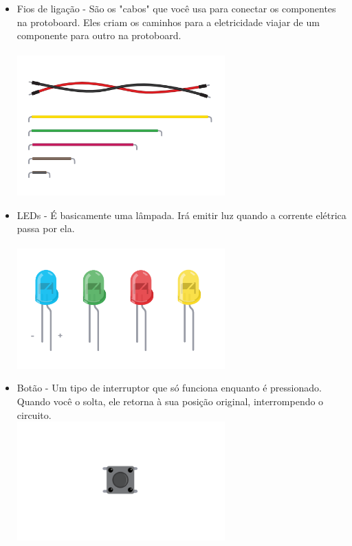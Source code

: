 \documentclass{report}
\begin{document}
\begin{itemize}
		\item Fios de ligação - São os "cabos" que você usa para conectar os componentes na protoboard. Eles criam os caminhos para a eletricidade viajar de um componente para outro na protoboard. \\ \\
		\includegraphics[width=8cm]{imagens/fios_ligacao.png}
		
		\item LEDs - É basicamente uma lâmpada. Irá emitir luz quando a corrente elétrica passa por ela. \\ \\
		\includegraphics[width=8cm]{imagens/leds.png}
		
		\item Botão - Um tipo de interruptor que só funciona enquanto é pressionado. Quando você o solta, ele retorna à sua posição original, interrompendo o circuito. \\
		\includegraphics[width=8cm]{imagens/botao.png}
		

\end{itemize}
\end{document}
